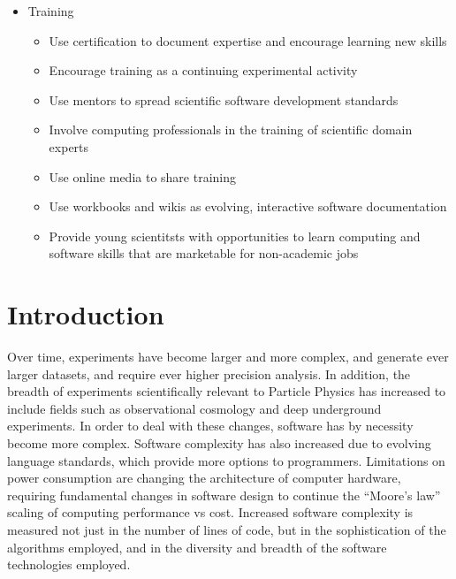 \begin{itemize}
    \item Training
    \begin{itemize}
        \item Use certification to document expertise and encourage learning new skills
        \item Encourage training as a continuing experimental activity
        \item Use mentors to spread scientific software development standards
        \item Involve computing professionals in the training of scientific domain experts
        \item Use online media to share training
        \item Use workbooks and wikis as evolving, interactive software documentation
        \item Provide young scientitsts with opportunities to learn computing and software skills that are marketable for non-academic jobs
    \end{itemize}



\end{itemize}


\section{Introduction}
\label{sec:Intro}

Over time, \HEP experiments have become larger and more complex, and generate ever larger datasets, and require ever higher
precision analysis.  In addition, the breadth of experiments scientifically relevant to Particle Physics has increased to
include fields such as observational cosmology and deep underground experiments.
In order to deal with these changes, \HEP software has by necessity become more complex.
Software complexity has also increased due to evolving language standards, which provide more options to programmers.
Limitations on power consumption are changing the architecture of computer hardware,
requiring fundamental changes in software design to continue the ``Moore's law'' scaling of computing performance vs cost.
Increased software complexity is measured not just in
the number of lines of code, but in the sophistication of the algorithms employed, and in the diversity and
breadth of the software technologies employed.

